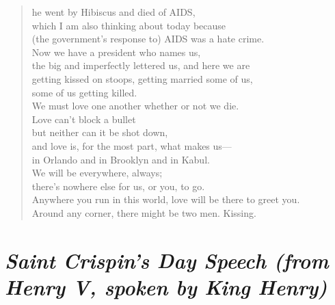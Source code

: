 \begin{verse}
	he went by Hibiscus and died of AIDS,\\
	which I am also thinking about today because\\
	(the government's response to) AIDS was a hate crime.\\
	Now we have a president who names us,\\
	the big and imperfectly lettered us, and here we are\\
	getting kissed on stoops, getting married some of us,\\
	some of us getting killed.\\
	We must love one another whether or not we die.\\
	Love can't block a bullet\\
	but neither can it be shot down,\\
	and love is, for the most part, what makes us—\\
	in Orlando and in Brooklyn and in Kabul.\\
	We will be everywhere, always;\\
	there's nowhere else for us, or you, to go.\\
	Anywhere you run in this world, love will be there to greet you.\\
	Around any corner, there might be two men. Kissing.
\end{verse}

\newpage
\section*{\emph{Saint Crispin's Day Speech (from \emph{Henry V}, spoken by King Henry)}}
